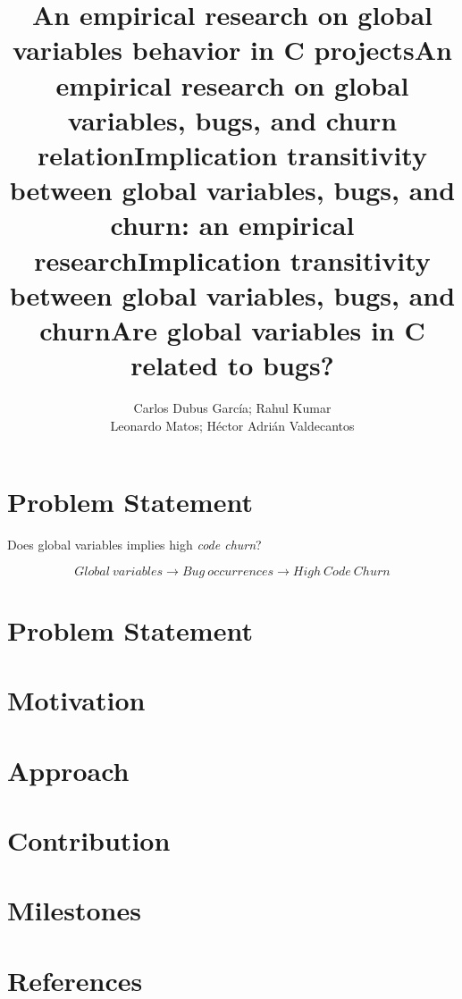 \documentclass[a4paper,12pt]{article}
\begin{document}
\title{An empirical research on global variables behavior in C projects}
\title{An empirical research on global variables, bugs, and churn relation}
\title{Implication transitivity between global variables, bugs,  and churn: an empirical research}
\title{Implication transitivity between global variables, bugs,  and churn}
\title{Are global variables in C related to bugs?}

\author{Carlos Dubus Garc\'{i}a; Rahul Kumar\\
Leonardo Matos;
H\'{e}ctor Adri\'{a}n Valdecantos}

\maketitle

\section*{Problem Statement}
Does global variables implies high \emph{code churn}?

\[ Global\ variables \to Bug\ occurrences \to High\ Code\ Churn \]

\section*{Problem Statement}


\section*{Motivation}


\section*{Approach}


\section*{Contribution}


\section*{Milestones}


\section*{References}
\end{document}
